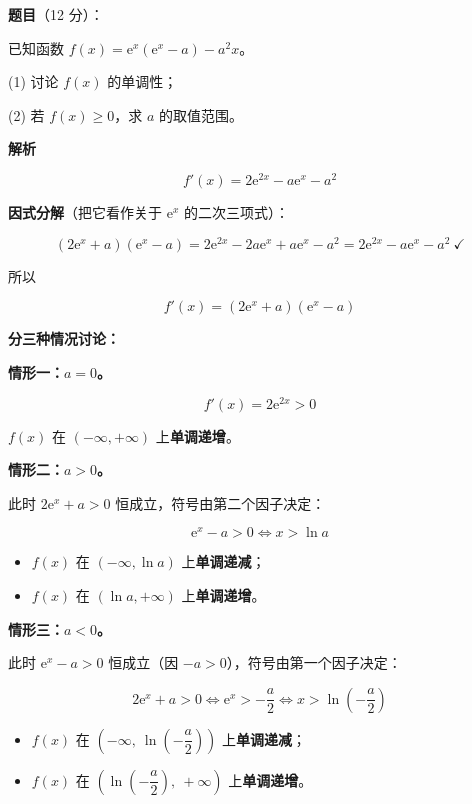 \begin{answer}

\textbf{题目}（12 分）：

已知函数 $f(x)=\mathrm e^{x}\left(\mathrm e^{x}-a\right)-a^{2}x$。

  (1) 讨论 $f(x)$ 的单调性；

  (2) 若 $f(x)\ge0$，求 $a$ 的取值范围。

\textbf{解析}


\nopagebreak[4]
\[f'(x)=2\mathrm e^{2x}-a\mathrm e^{x}-a^{2}\]

\textbf{因式分解}（把它看作关于 $\mathrm e^{x}$ 的二次三项式）：

\nopagebreak[4]
\[\left(2\mathrm e^{x}+a\right)\left(\mathrm e^{x}-a\right)=2\mathrm e^{2x}-2a\mathrm e^{x}+a\mathrm e^{x}-a^{2}=2\mathrm e^{2x}-a\mathrm e^{x}-a^{2}\ \checkmark\]

所以

\nopagebreak[4]
\[f'(x)=\left(2\mathrm e^{x}+a\right)\left(\mathrm e^{x}-a\right)\]

\textbf{分三种情况讨论：}

\textbf{情形一：$a=0$。}

\nopagebreak[4]
\[f'(x)=2\mathrm e^{2x}>0\]

$f(x)$ 在 $(-\infty,+\infty)$ 上\textbf{单调递增}。

\textbf{情形二：$a>0$。}

此时 $2\mathrm e^{x}+a>0$ 恒成立，符号由第二个因子决定：

\nopagebreak[4]
\[\mathrm e^{x}-a>0\iff x>\ln a\]

\begin{itemize}
\item $f(x)$ 在 $(-\infty,\ln a)$ 上\textbf{单调递减}；
\item $f(x)$ 在 $(\ln a,+\infty)$ 上\textbf{单调递增}。
\end{itemize}

\textbf{情形三：$a<0$。}

此时 $\mathrm e^{x}-a>0$ 恒成立（因 $-a>0$），符号由第一个因子决定：

\nopagebreak[4]
\[2\mathrm e^{x}+a>0\iff \mathrm e^{x}>-\frac a2\iff x>\ln\left(-\frac a2\right)\]

\begin{itemize}
\item $f(x)$ 在 $\left(-\infty,\ \ln\left(-\dfrac a2\right)\right)$ 上\textbf{单调递减}；
\item $f(x)$ 在 $\left(\ln\left(-\dfrac a2\right),\ +\infty\right)$ 上\textbf{单调递增}。
\end{itemize}


\end{answer}
